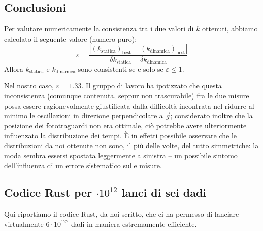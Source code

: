 \documentclass{article}
\begin{document}
\subsection{Conclusioni}
Per valutare numericamente la consistenza tra i due valori di $k$ ottenuti,
abbiamo calcolato il seguente valore (numero puro):
\[
    \varepsilon =
    \frac{
        \left|\left(k_\text{statica}\right)_\text{best} - \left(k_\text{dinamica}\right)_\text{best}\right|
    }{
        \delta k_\text{statica} + \delta k_\text{dinamica}
    }
\]
Allora $k_\text{statica}$ e $k_\text{dinamica}$ sono consistenti se e solo se $\varepsilon \le 1$.

Nel nostro caso, $\varepsilon = 1.33$. Il gruppo di lavoro ha ipotizzato che
questa inconsistenza (comunque contenuta, seppur non trascurabile) fra le due
misure possa essere ragionevolmente giustificata dalla difficoltà incontrata
nel ridurre al minimo le oscillazioni in direzione perpendicolare a $\vec{g}$;
considerato inoltre che la posizione dei fototraguardi non era ottimale, ciò
potrebbe avere ulteriormente influenzato la distribuzione dei tempi. È in
effetti possibile osservare che le distribuzioni da noi ottenute non sono,
il più delle volte, del tutto simmetriche: la moda sembra essersi spostata
leggermente a sinistra – un possibile sintomo dell'influenza di un
errore sistematico sulle misure.

\pagebreak
\begin{appendices}
    \section{Codice Rust per $\cdot10^{12}$ lanci di sei dadi}
    Qui riportiamo il codice Rust, da noi scritto, che ci ha permesso di
    lanciare virtualmente $6\cdot10^{12?}$ dadi in maniera estremamente
    efficiente.

    \inputminted[linenos, mathescape]{rust}{src/main.rs}
\end{appendices}
\end{document}
